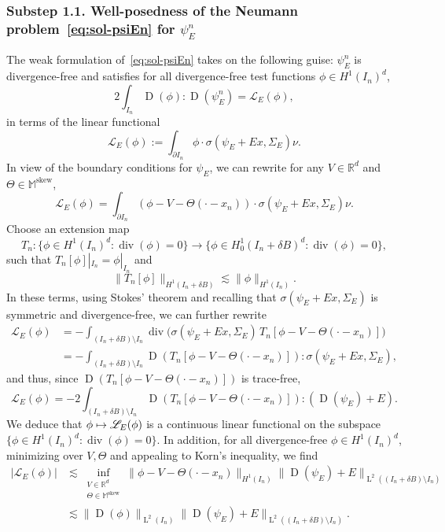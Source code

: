 \documentclass[JEP,XML,SOM,Unicode,published]{cedram}
\let\mathcal\mathscr
\newcommand\mto{\mathchoice{\longmapsto}{\mapsto}{\mapsto}{\mapsto}}
\theoremstyle{plain}
\theoremstyle{definition}
\newcommand{\Lc}{\mathcal{L}}
\newcommand{\R}{\mathbb R}
\newcommand{\Md}{\mathbb M}
\newcommand{\D}{\operatorname{D}}
\newcommand{\Ld}{\operatorname{L}}
\newcommand{\Div}{{\operatorname{div}}}
\newcommand{\Skew}{{\operatorname{skew}}}
\newcommand{\substep}[1]{\subsubsection*{Substep #1}}
\begin{document}
\substep{1.1. Well-posedness of the Neumann problem~\eqref{eq:sol-psiEn} for $\psi_E^n$}
The weak formulation of~\eqref{eq:sol-psiEn} takes on the following guise: $\psi_E^n$ is divergence-free and satisfies for all divergence-free test functions $\phi\in H^1(I_n)^d$,
\begin{equation}\label{eq:funct-psin}
2\int_{I_n}\D(\phi):\D(\psi_E^{n})=\Lc_E(\phi),
\end{equation}
in terms of the linear functional
\[\Lc_E(\phi):=\int_{\partial I_n}\phi\cdot\sigma(\psi_E+Ex,\Sigma_E)\nu.\]
In view of the boundary conditions for $\psi_E$, we can rewrite for any $V\in\R^d$ and $\Theta\in\Md^\Skew$,
\[\Lc_E(\phi)=\int_{\partial I_n}(\phi-V-\Theta(\cdot-x_n))\cdot\sigma(\psi_E+Ex,\Sigma_E)\nu.\]
Choose an extension map
\[T_n:\big\{\phi\in H^1(I_n)^d:\Div(\phi)=0\big\}\to\big\{\phi\in H^1_0(I_n+\delta B)^d:\Div(\phi)=0\big\},\]
such that $T_n[\phi]|_{I_n}=\phi|_{I_n}$ and
\[\|T_n[\phi]\|_{H^1(I_n+\delta B)}\lesssim \|\phi\|_{H^1(I_n)}.\]
In these terms, using Stokes' theorem and recalling that $\sigma(\psi_E+Ex,\Sigma_E)$ is symmetric and divergence-free, we can further rewrite
\begin{align*}
\Lc_E(\phi)
&=-\int_{(I_n+\delta B)\setminus I_n}\Div\Big(\sigma(\psi_E+Ex,\Sigma_E)\,T_n[\phi-V-\Theta(\cdot-x_n)]\Big)\nonumber\\
&=
-\int_{(I_n+\delta B)\setminus I_n}\D(T_n[\phi-V-\Theta(\cdot-x_n)]):\sigma(\psi_E+Ex,\Sigma_E),
\end{align*}
and thus, since $\D(T_n[\phi-V-\Theta(\cdot-x_n)])$ is trace-free,
\begin{equation}\label{eq:extension-eqn}
\Lc_E(\phi)
=-2\int_{(I_n+\delta B)\setminus I_n}\D(T_n[\phi-V-\Theta(\cdot-x_n)]):(\D(\psi_E)+E).
\end{equation}
We deduce that $\phi\mto\Lc_E(\phi)$ is a continuous linear functional on the subspace \hbox{$\{\phi\in H^1(I_n)^d:\Div(\phi)=0\}$}. In addition, for all divergence-free $\phi\in H^1(I_n)^d$,
minimizing over $V,\Theta$ and appealing to Korn's inequality,
we find
\begin{equation*}\label{eq:bnd-LE}
\begin{aligned}
|\Lc_E(\phi)|
&\lesssim \inf_{\substack{V\in\R^d\\\Theta\in\Md^\Skew}}\|\phi-V-\Theta(\cdot-x_n)\|_{H^1(I_n)}\|\!\D(\psi_E)+E\|_{\Ld^2((I_n+\delta B)\setminus I_n)}\nonumber\\
&\lesssim \|\!\D(\phi)\|_{\Ld^2(I_n)}\|\!\D(\psi_E)+E\|_{\Ld^2((I_n+\delta B)\setminus I_n)}.
\end{aligned}
\end{equation*}
\end{document}
